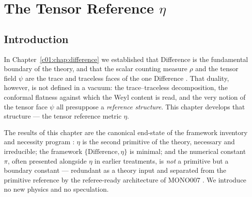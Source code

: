 %
%


\chapter{The Tensor Reference \texorpdfstring{$\eta$}{eta}}
\label{c02:chap:eta}

\section{Introduction}
\label{c02:sec:eta-introduction}

In Chapter~\ref{c01:chap:difference} we established that Difference is the fundamental boundary
of the theory, and that the scalar counting measure $\rho$ and the tensor field $\psi$ are
the trace and traceless faces of the one Difference \cite{c02:QG286}. That duality, however,
is not defined in a vacuum: the trace--traceless decomposition, the conformal flatness
against which the Weyl content is read, and the very notion of the tensor face $\psi$ all
presuppose a \emph{reference structure}. This chapter develops that structure --- the tensor
reference metric $\eta$.

The results of this chapter are the canonical end-state of the framework inventory and
necessity program \cite{c02:QG289,c02:QG290,c02:QG291,c02:QG292}: $\eta$ is the second primitive of the
theory, necessary and irreducible; the framework $\{\text{Difference},\eta\}$ is minimal;
and the numerical constant $\pi$, often presented alongside $\eta$ in earlier treatments, is
\emph{not} a primitive but a boundary constant --- redundant as a theory input and separated
from the primitive reference by the referee-ready architecture of MONO007
\cite{c02:MONO007}. We introduce no new physics and no speculation.

